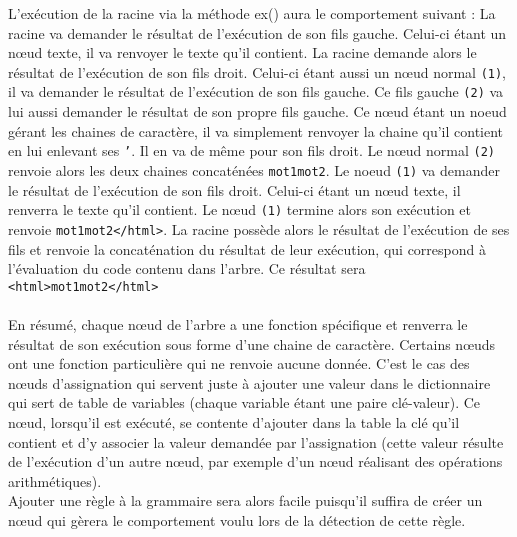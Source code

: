 \documentclass[a4paper,10pt]{article}
\begin{document}
\noindent
L'exécution de la racine via la méthode \textrm{ex()} aura le comportement suivant : \newline
\newline
La racine va demander le résultat de l'exécution de son fils gauche. Celui-ci étant un nœud texte, il va renvoyer le texte qu'il contient. \newline
La racine demande alors le résultat de l'exécution de son fils droit. Celui-ci étant aussi un nœud normal \texttt{(1)}, il va demander le résultat de l'exécution de son fils gauche.
Ce fils gauche \texttt{(2)} va lui aussi demander le résultat de son propre fils gauche. Ce nœud étant un noeud gérant les chaines de caractère, il va simplement renvoyer la chaine qu'il
contient en lui enlevant ses \texttt{'}. Il en va de même pour son fils droit. Le nœud normal \texttt{(2)} renvoie alors les deux chaines concaténées \texttt{mot1mot2}.
\newline
Le noeud \texttt{(1)} va demander le résultat de l'exécution de son fils droit. Celui-ci étant un nœud texte, il renverra le texte qu'il contient. Le nœud \texttt{(1)} termine alors son
exécution et renvoie \texttt{mot1mot2</html>}.\newline \newline
La racine possède alors le résultat de l'exécution de ses fils et renvoie la concaténation du résultat de leur exécution, qui correspond à l'évaluation du code contenu dans l'arbre. Ce résultat sera \texttt{<html>mot1mot2</html>}
\\
\\
En résumé, chaque nœud de l'arbre a une fonction spécifique et renverra le résultat de son exécution sous forme d'une chaine de caractère.\newline
Certains nœuds ont une fonction particulière qui ne renvoie aucune donnée. C'est le cas des nœuds d'assignation qui servent juste à ajouter une valeur dans le dictionnaire qui sert de 
table de variables (chaque variable étant une paire clé-valeur). Ce nœud, lorsqu'il est exécuté, se contente d'ajouter dans la table la clé qu'il contient et d'y associer la valeur demandée
par l'assignation (cette valeur résulte de l'exécution d'un autre nœud, par exemple d'un nœud réalisant des opérations arithmétiques). \\
Ajouter une règle à la grammaire sera alors facile puisqu'il suffira de créer un nœud qui gèrera le comportement voulu lors de la détection de cette règle. 
\end{document}
